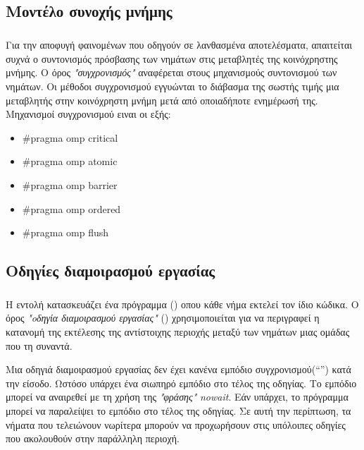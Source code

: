 \subsection{Μοντέλο συνοχής μνήμης}
\subparagraph{}
Για την αποφυγή φαινομένων  που οδηγούν σε λανθασμένα αποτελέσματα, απαιτείται συχνά ο συντονισμός πρόσβασης των νημάτων στις μεταβλητές της κοινόχρηστης μνήμης. Ο όρος \emph{"συγχρονισμός"} αναφέρεται στους μηχανισμούς συντονισμού των νημάτων. Οι μέθοδοι συγχρονισμού εγγυώνται το διάβασμα της σωστής τιμής μια μεταβλητής στην κοινόχρηστη μνήμη μετά από οποιαδήποτε ενημέρωσή της. Μηχανισμοί συγχρονισμού ειναι οι\cite{book2_23} εξής:
\begin{itemize}
    \item {\#}pragma omp critical 
    \item {\#}pragma omp atomic
    \item {\#}pragma omp barrier 
    \item {\#}pragma omp ordered
    \item {\#}pragma omp flush
\end{itemize}

\subsection{Οδηγίες διαμοιρασμού εργασίας}
\subparagraph{}
Η εντολή  κατασκευάζει ένα  πρόγραμμα () οπου κάθε νήμα εκτελεί τον ίδιο κώδικα. Ο όρος \emph{"oδηγία διαμοιρασμού εργασίας"} () χρησιμοποιείται για να περιγραφεί η κατανομή της εκτέλεσης της αντίστοιχης περιοχής μεταξύ των νημάτων μιας ομάδας που τη συναντά.

Μια οδηγιά διαμοιρασμού εργασίας δεν έχει κανένα εμπόδιο συγχρονισμού(“”) κατά την είσοδο. Ωστόσο υπάρχει ένα σιωπηρό εμπόδιο στο τέλος της οδηγίας. Το εμπόδιο μπορεί να αναιρεθεί με τη χρήση της \emph{"φράσης"}  \emph{nowait}. Εάν υπάρχει, το πρόγραμμα μπορεί να παραλείψει το εμπόδιο στο τέλος της οδηγίας. Σε αυτή την περίπτωση, τα νήματα που τελειώνουν νωρίτερα μπορούν να προχωρήσουν στις υπόλοιπες οδηγίες που ακολουθούν στην παράλληλη περιοχή\cite{openmpse16}.

\ \\
\ \\
